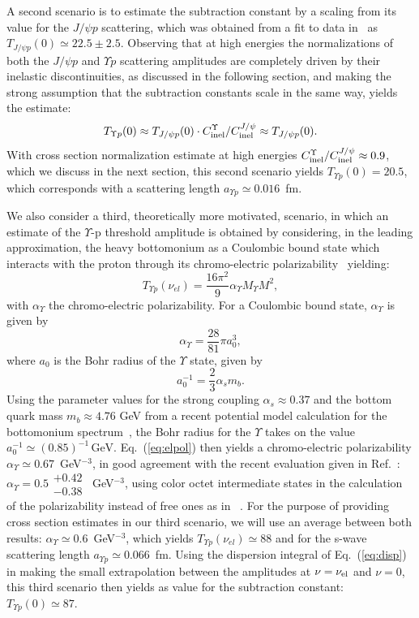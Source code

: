\documentclass[prd,amsmath,twocolumn,floatfix,amssymb, preprintnumbers, linenumbers,nofootinbib, superscriptaddress]{revtex4}
\newcommand{\beq}{\begin{equation}}
\newcommand{\eeq}{\end{equation}}
\begin{document}
A second scenario is to estimate the subtraction constant by a scaling from its value for the $J/\psi p$ scattering, which was obtained from a fit to data in~\cite{Gryniuk:2016mpk} as $T_{J/\psi p }(0) \simeq 22.5 \pm 2.5$. 
Observing that at high energies the normalizations of both the $J/\psi p$ and $\Upsilon p$ scattering amplitudes are completely driven by their inelastic discontinuities, as discussed in the following section, and making the strong assumption that the subtraction constants scale in the same way, yields the estimate: 
\beq
T_{\Upsilon p}(0) \approx T_{J/\psi p }(0) \cdot C_{\rm inel}^\Upsilon / C_{\rm inel}^{J/\psi} \approx T_{J/\psi p }(0).
\eeq
With cross section normalization estimate 
at high energies  
$C_{\rm inel}^\Upsilon / C_{\rm inel}^{J/\psi} \approx 0.9$, which we discuss in the next section, this second scenario yields $T_{\Upsilon p}(0) = 20.5$, which corresponds with a scattering length $a_{\Upsilon p} \simeq 0.016$~fm. 

We also consider a third, theoretically more motivated, scenario, in which an estimate of the $\Upsilon$-p threshold amplitude is obtained by considering, in the leading approximation,  the heavy bottomonium 
as a Coulombic bound state which interacts with the proton through its chromo-electric polarizability~\cite{Peskin:1979va} yielding:
\beq
T_{\Upsilon p}(\nu_{el}) = \frac{16\pi^2}{9} \alpha_\Upsilon M_{\Upsilon} M^2,
\eeq
with $\alpha_\Upsilon$ the chromo-electric polarizability.  
For a Coulombic bound state, $\alpha_\Upsilon$ is given by~\cite{Peskin:1979va,Bhanot:1979vb}
\beq
\alpha_\Upsilon = \frac{28}{81} \pi a_0^3,
\label{eq:elpol}
\eeq
where $a_0$ is the Bohr radius of the $\Upsilon$ state, given by
\beq
a_0^{-1} = \frac{2}{3}\alpha_s m_b.
\eeq
Using the parameter values for the strong coupling $\alpha_s\approx 0.37$ and the bottom quark mass $m_b\approx 4.76$ GeV from a recent potential model calculation for the bottomonium spectrum~\cite{Deng:2016ktl}, the Bohr radius for the $\Upsilon$ takes on the value
$a_0^{-1} \simeq (0.85)^{-1} \,\mathrm{GeV}$. 
Eq.~(\ref{eq:elpol}) then yields a chromo-electric polarizability $\alpha_\Upsilon \simeq 0.67$~GeV$^{-3}$, in good agreement with the recent evaluation given in Ref.~\cite{Brambilla:2015rqa}: 
$\alpha_\Upsilon = 0.5 \substack{+0.42 \\ -0.38}$~GeV$^{-3}$, using color octet intermediate states in the calculation of the polarizability instead of free ones as in ~\cite{Peskin:1979va,Bhanot:1979vb}. For the purpose of providing cross section estimates in our third scenario, we will use an average between both results: $\alpha_\Upsilon \simeq 0.6$~GeV$^{-3}$, 
which yields $T_{\Upsilon p}(\nu_{el}) \simeq 88$ and for the s-wave scattering length $a_{\Upsilon p} \simeq 0.066$~fm. Using the dispersion integral of Eq.~(\ref{eq:disp}) in making the small extrapolation between the amplitudes at $\nu = \nu_{\rm el}$ and $\nu = 0$, this third scenario then yields as value for the subtraction constant: $T_{\Upsilon p}(0) \simeq 87$. 
\end{document}
